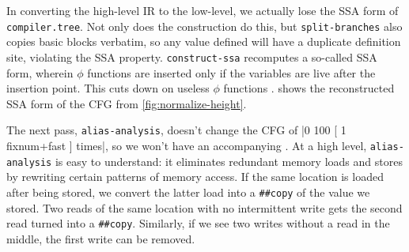 
In converting the high-level \gls{IR} to the low-level, we actually lose the
\gls{SSA} form of \Verb|compiler.tree|.  Not only does the construction do
this, but \Verb|split-branches| also copies basic blocks verbatim, so any
value defined will have a duplicate definition site, violating the \gls{SSA}
property.  \Verb|construct-ssa| recomputes a so-called 
\gls{SSA} form, wherein $\phi$ functions are inserted only if the variables are
live after the insertion point.  This cuts down on useless $\phi$ 
%
functions \autocites{TDMSC,construct-ssa}.
%
 shows the reconstructed \gls{SSA} form of the
\gls{CFG} from \vref{fig:normalize-height}.

The next pass, \Verb|alias-analysis|, doesn't change the \gls{CFG} of
%
\factor|0 100 [ 1 fixnum+fast ] times|,
%
so we won't have an accompanying .  At a high
level, \Verb|alias-analysis| is easy to understand: it eliminates redundant
memory loads and stores by rewriting certain patterns of memory access.  If the
same location is loaded after being stored, we convert the latter load into a
\Verb|##copy| of the value we stored.  Two reads of the same location with no
intermittent write gets the second read turned into a \Verb|##copy|.
Similarly, if we see two writes without a read in the middle, the first write
can be removed.


